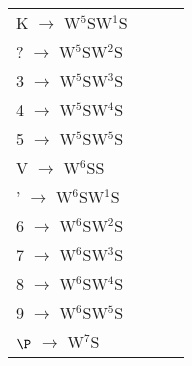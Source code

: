 \documentclass[12pt]{article}
\begin{document}
\begin{tabular}{l l l l}
K $\rightarrow$ W{$^{5}$}SW{$^{1}$}S	&	\\
? $\rightarrow$ W{$^{5}$}SW{$^{2}$}S	&	\\
3 $\rightarrow$ W{$^{5}$}SW{$^{3}$}S	&	\\
4 $\rightarrow$ W{$^{5}$}SW{$^{4}$}S	&	\\
5 $\rightarrow$ W{$^{5}$}SW{$^{5}$}S	&	\\
V $\rightarrow$ W{$^{6}$}SS	&	\\
' $\rightarrow$ W{$^{6}$}SW{$^{1}$}S	&	\\
6 $\rightarrow$ W{$^{6}$}SW{$^{2}$}S	&	\\
7 $\rightarrow$ W{$^{6}$}SW{$^{3}$}S	&	\\
8 $\rightarrow$ W{$^{6}$}SW{$^{4}$}S	&	\\
9 $\rightarrow$ W{$^{6}$}SW{$^{5}$}S	&	\\
$\P$ $\rightarrow$ W{$^{7}$}S	&	\\
\end{tabular}
\end{document}
